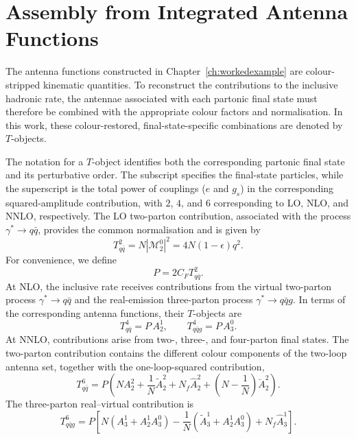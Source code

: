 \section{Assembly from Integrated Antenna Functions}\label{subsec:Tobjects}

The antenna functions constructed in Chapter~\ref{ch:workedexample} are colour-stripped kinematic
quantities. To reconstruct the contributions to the inclusive hadronic rate, the antennae associated
with each partonic final state must therefore be combined with the appropriate colour factors and
normalisation. In this work, these colour-restored, final-state-specific combinations are denoted by
$T$-objects.

The notation for a $T$-object identifies both the corresponding partonic final state and its
perturbative order. The subscript specifies the final-state particles, while the superscript is the total power of couplings ($e$ and $g_s$) in the corresponding squared-amplitude contribution, with $2$, $4$, and $6$ corresponding to LO, NLO, and NNLO, respectively. The
LO two-parton contribution, associated with the process $\gamma^*\to q\bar q$, provides the common
normalisation and is given by
\begin{equation}
    T_{q\bar q}^2 = N\left|\mathcal M_2^0\right|^2 = 4N(1-\epsilon)q^2.
\end{equation}
For convenience, we define
\begin{equation}
    P = 2C_FT_{q\bar q}^2.
\end{equation}
At NLO, the inclusive rate receives contributions from the virtual two-parton process
$\gamma^*\to q\bar q$ and the real-emission three-parton process $\gamma^*\to q\bar q g$. In terms of
the corresponding antenna functions, their $T$-objects are
\begin{equation}
    T_{q\bar q}^4 = P\,A_2^1,\qquad
    T_{q\bar qg}^4 = P\,A_3^0.
\end{equation}
At NNLO, contributions arise from two-, three-, and four-parton final states. The two-parton
contribution contains the different colour components of the two-loop antenna set, together with the
one-loop-squared contribution,
\begin{equation}
    T_{q\bar q}^6 = P\left(NA_2^2+\frac1N\tilde A_2^2+N_f\hat A_2^2+\left(N-\frac1N\right)\breve A_2^2\right).
\end{equation}
The three-parton real--virtual contribution is
\begin{equation}
    T_{q\bar qg}^6 = P\left[N\!\left(A_3^1+A_2^1A_3^0\right)-\frac1N\!\left(\tilde A_3^1+A_2^1A_3^0\right)+N_f\hat A_3^1\right].
\end{equation}
